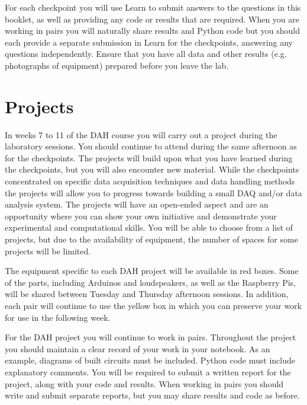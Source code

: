 For each checkpoint you will use Learn to submit answers to the questions in this booklet, as well as providing any code or results that are required.
When you are working in pairs you will naturally share results and Python code but you should each provide a separate submission in Learn for the checkpoints, answering any questions independently.
Ensure that you have all data and other results (e.g. photographs of equipment) prepared before you leave the lab.

\section{Projects}

In weeks 7 to 11 of the DAH course you will carry out a project during the laboratory sessions.
You should continue to attend during the same afternoon as for the checkpoints.
The projects will build upon what you have learned during the checkpoints, but you will also encounter new material.
While the checkpoints concentrated on specific data acquisition techniques and data handling methods the projects will allow you to progress towards building a small DAQ and/or data analysis system.
The projects will have an open-ended aspect and are an opportunity where you can show your own initiative and demonstrate your experimental and computational skills. 
You will be able to choose from a list of projects, but due to the availability of equipment, the number of spaces for some projects will be limited.

The equipment specific to each DAH project will be available in red boxes.
Some of the parts, including Arduinos and loudspeakers, as well as the Raspberry Pis, will be shared between Tuesday and Thursday afternoon sessions.
In addition, each pair will continue to use the yellow box in which you can preserve your work for use in the following week. 

For the DAH project you will continue to work in pairs.
Throughout the project you should maintain a clear record of your work in your notebook.
As an example, diagrams of built circuits must be included.
Python code must include explanatory comments.
You will be required to submit a written report for the project, along with your code and results.
When working in pairs you should write and submit separate reports, but you may share results and code as before.

